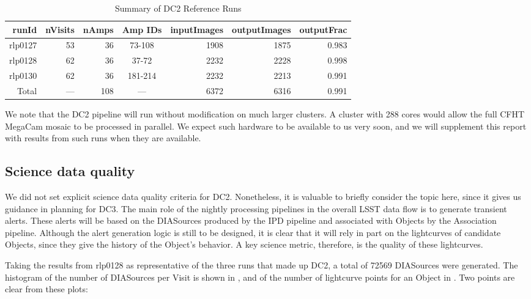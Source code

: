 \begin{table}[htbp]
\begin{center}
\caption{Summary of DC2 Reference Runs\label{t6-1}}
\vspace{\baselineskip}
\begin{tabular}{ | r | r | r | c | r | r | r |}
\hline
runId & nVisits & nAmps & Amp IDs & inputImages & outputImages & outputFrac \\ \hline
rlp0127 & 53 &  36 &  73-108 & 1908 & 1875 & 0.983 \\ \hline
rlp0128 & 62 &  36 &  37-72  & 2232 & 2228 & 0.998  \\ \hline
rlp0130 & 62 &  36 & 181-214 & 2232 & 2213 & 0.991 \\ \hline
Total   & --- & 108 &   ---    & 6372 & 6316 & 0.991 \\ \hline
\hline
\end{tabular}
\end{center}
\end{table}

We note that the DC2 pipeline will run without modification on much
larger clusters.  A cluster with 288 cores would allow the full CFHT
MegaCam mosaic to be processed in parallel.  We expect such hardware
to be available to us very soon, and we will supplement this report
with results from such runs when they are available.

\subsection{Science data quality}
\label{ScienceDataQuality}

We did not set explicit science data quality criteria for DC2.
Nonetheless, it is valuable to briefly consider the topic here, since it gives
us guidance in planning for DC3.  The main role of the nightly
processing pipelines in the overall LSST data flow is to generate
transient alerts.  These alerts will be based on the DIASources produced by
the IPD pipeline and associated with Objects by the Association
pipeline. Although the alert generation logic is still to be designed,
it is clear that it will rely in part on the lightcurves of candidate
Objects, since they give the history of the Object's behavior.  A key
science metric, therefore, is the quality of these lightcurves.

Taking the results from rlp0128 as representative of the three runs
that made up DC2, a total of 72569 DIASources were generated.  The
histogram of the number of DIASources per Visit is shown in ,
and of the number of lightcurve points for an Object in .  Two
points are clear from these plots:

